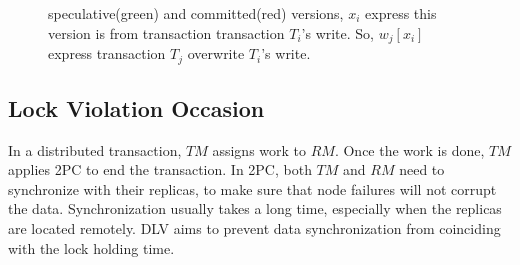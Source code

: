 \documentclass[conference]{IEEEtran}
\begin{document}
\begin{figure}[htbp]
{  }
  \caption{speculative(green) and committed(red) versions,
  ${x_i}$ express this version is from transaction transaction ${T_i}$'s write.
So, $w_j[x_i]$ express transaction ${T_j}$ overwrite ${T_i}$'s write. 
}
\label{fig:versions_example}
\end{figure}

\subsection {Lock Violation Occasion}


In a distributed transaction, $TM$ assigns work to $RM$. Once the work is done, $TM$ applies 2PC to end the transaction.
In 2PC, both $TM$ and $RM$ need to synchronize with their replicas, to make sure that node failures will not corrupt the data.
Synchronization usually takes a long time, especially when the replicas are located remotely.
DLV aims to prevent data synchronization from coinciding with the lock holding time.
\end{document}
